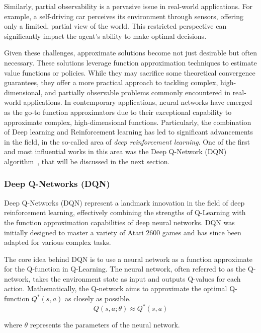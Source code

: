 Similarly, partial observability is a pervasive issue in real-world applications. 
 For example, a self-driving car perceives its environment through sensors, 
 offering only a limited, partial view of the world. 
 This restricted perspective can significantly impact the agent's ability to make optimal decisions.

Given these challenges, approximate solutions become not just desirable but often necessary. 
 These solutions leverage function approximation techniques to estimate value functions or policies. 
 While they may sacrifice some theoretical convergence guarantees, 
 they offer a more practical approach to tackling complex, high-dimensional, and partially observable problems commonly encountered in real-world applications.
%
In contemporary applications, neural networks have emerged as the go-to function approximators due to their exceptional capability to approximate complex, 
 high-dimensional functions. 
 Particularly, the combination of Deep learning and Reinforcement learning has led to significant advancements in the field, in the so-called area of \emph{deep reinforcement learning}.
 One of the first and most influential works in this area was the Deep Q-Network (DQN) algorithm~\cite{DBLP:journals/corr/MnihKSGAWR13}, that will be discussed in the next section.
 \subsubsection{Deep Q-Networks (DQN)}

 Deep Q-Networks (DQN) represent a landmark innovation in the field of deep reinforcement learning, 
  effectively combining the strengths of Q-Learning with the function approximation capabilities of deep neural networks.
  DQN was initially designed to master a variety of Atari 2600 games and has since been adapted for various complex tasks.
 
 The core idea behind DQN is to use a neural network as a function approximate for the Q-function in Q-Learning. 
  The neural network, often referred to as the Q-network, 
  takes the environment state as input and outputs Q-values for each action.
%  
Mathematically, the Q-network aims to approximate the optimal Q-function \(Q^*(s, a)\) 
 as closely as possible.
\begin{equation}
Q(s, a; \theta) \approx Q^*(s, a)
\end{equation}
 
where \(\theta\) represents the parameters of the neural network.
 
